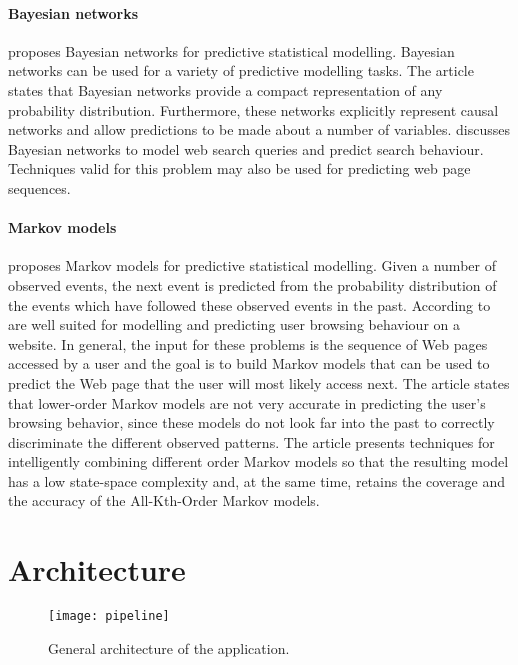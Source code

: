 \documentclass[a4paper,10pt]{article}
\begin{document}
\paragraph{Bayesian networks} \cite{predictive-statistical-models} proposes Bayesian networks for predictive statistical modelling. Bayesian networks can be used for a variety of predictive modelling tasks. The article states that Bayesian networks provide a compact representation of any probability distribution. Furthermore, these networks explicitly represent causal networks and allow predictions to be made about a number of variables. \cite{search-prediction} discusses Bayesian networks to model web search queries and predict search behaviour. Techniques valid for this problem may also be used for predicting web page sequences.

\paragraph{Markov models} \cite{predictive-statistical-models} proposes Markov models for predictive statistical modelling. Given a number of observed events, the next event is predicted from the probability distribution of the events which have followed these observed events in the past. According to \cite{markov-web-page-accesses} are well suited for modelling and predicting user browsing behaviour on a website. In general, the input for these problems is the sequence of Web pages accessed by a user and the goal is to build Markov models that can be used to predict the Web page that the user will most likely access next. The article states that lower-order Markov models are not very accurate in predicting the user's browsing behavior, since these models do not look far into the past to correctly discriminate the different observed patterns. The article presents techniques for intelligently combining different order Markov models so that the resulting model has a low state-space complexity and, at the same time, retains the coverage and the accuracy of the All-Kth-Order Markov models.



\section{Architecture}

\begin{figure}[H]
\texttt{[image: pipeline]}
\caption{General architecture of the application.}
\label{pipeline}
\end{figure}
\end{document}

